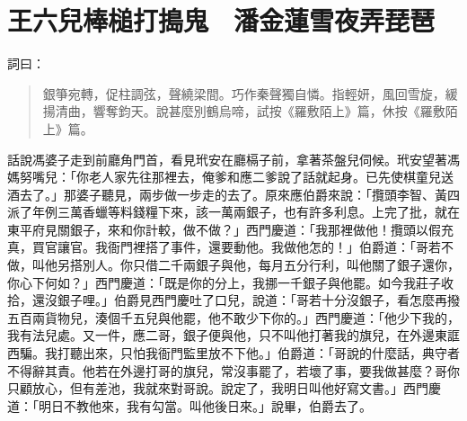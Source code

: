 
\chapter{王六兒棒槌打搗鬼　潘金蓮雪夜弄琵琶}

詞曰：
\begin{quote}
銀箏宛轉，促柱調弦，聲繞梁間。巧作秦聲獨自憐。指輕妍，風回雪旋，緩揚清曲，響奪鈞天。說甚麼別鶴烏啼，試按《羅敷陌上》篇，休按《羅敷陌上》篇。
\end{quote}

話說馮婆子走到前廳角門首，看見玳安在廳槅子前，拿著茶盤兒伺候。玳安望著馮媽努嘴兒：「你老人家先往那裡去，俺爹和應二爹說了話就起身。已先使棋童兒送酒去了。」那婆子聽見，兩步做一步走的去了。原來應伯爵來說：「攬頭李智、黃四派了年例三萬香蠟等料錢糧下來，該一萬兩銀子，也有許多利息。上完了批，就在東平府見關銀子，來和你計較，做不做？」西門慶道：「我那裡做他！攬頭以假充真，買官讓官。我衙門裡搭了事件，還要動他。我做他怎的！」伯爵道：「哥若不做，叫他另搭別人。你只借二千兩銀子與他，每月五分行利，叫他關了銀子還你，你心下何如？」西門慶道：「既是你的分上，我挪一千銀子與他罷。如今我莊子收拾，還沒銀子哩。」伯爵見西門慶吐了口兒，說道：「哥若十分沒銀子，看怎麼再撥五百兩貨物兒，湊個千五兒與他罷，他不敢少下你的。」西門慶道：「他少下我的，我有法兒處。又一件，應二哥，銀子便與他，只不叫他打著我的旗兒，在外邊東誆西騙。我打聽出來，只怕我衙門監里放不下他。」伯爵道：「哥說的什麼話，典守者不得辭其責。他若在外邊打哥的旗兒，常沒事罷了，若壞了事，要我做甚麼？哥你只顧放心，但有差池，我就來對哥說。說定了，我明日叫他好寫文書。」西門慶道：「明日不教他來，我有勾當。叫他後日來。」說畢，伯爵去了。

